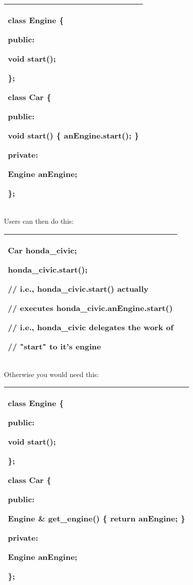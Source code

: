\documentclass[
]{article}
\begin{document}
\begin{longtable}[]{@{}l@{}}
\toprule
\endhead
\begin{minipage}[t]{0.97\columnwidth}\raggedright
class Engine \{

public:

void start();

\};

class Car \{

public:

void start() \{ anEngine.start(); \}

private:

Engine anEngine;

\};\strut
\end{minipage}\tabularnewline
\bottomrule
\end{longtable}

Users can then do this:

\begin{longtable}[]{@{}l@{}}
\toprule
\endhead
\begin{minipage}[t]{0.97\columnwidth}\raggedright
Car honda\_civic;

honda\_civic.start();

// i.e., honda\_civic.start() actually

// executes honda\_civic.anEngine.start()

// i.e., honda\_civic delegates the work of

// "start" to it's engine\strut
\end{minipage}\tabularnewline
\bottomrule
\end{longtable}

Otherwise you would need this:

\begin{longtable}[]{@{}l@{}}
\toprule
\endhead
\begin{minipage}[t]{0.97\columnwidth}\raggedright
class Engine \{

public:

void start();

\};

class Car \{

public:

Engine \& get\_engine() \{ return anEngine; \}

private:

Engine anEngine;

\};\strut
\end{minipage}\tabularnewline
\bottomrule
\end{longtable}
\end{document}
